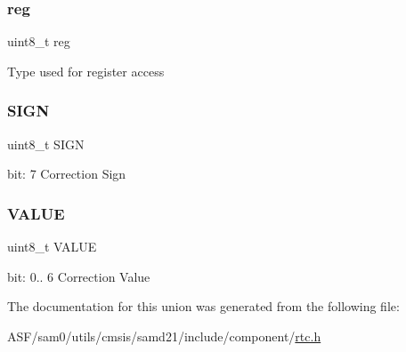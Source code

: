 \subsubsection{\texorpdfstring{reg}{reg}}
{\footnotesize\ttfamily uint8\+\_\+t reg}

Type used for register access \mbox{\label{union_r_t_c___f_r_e_q_c_o_r_r___type_a30425cd38d0d67a5052dc21383692fe4}} 
\subsubsection{\texorpdfstring{SIGN}{SIGN}}
{\footnotesize\ttfamily uint8\+\_\+t S\+I\+GN}

bit\+: 7 Correction Sign \mbox{\label{union_r_t_c___f_r_e_q_c_o_r_r___type_a9b29f156e0b21de552a157a1248ee48e}} 
\subsubsection{\texorpdfstring{VALUE}{VALUE}}
{\footnotesize\ttfamily uint8\+\_\+t V\+A\+L\+UE}

bit\+: 0.. 6 Correction Value 

The documentation for this union was generated from the following file\+:\begin{DoxyCompactItemize}
\item 
A\+S\+F/sam0/utils/cmsis/samd21/include/component/\mbox{\hyperlink{component_2rtc_8h}{rtc.\+h}}\end{DoxyCompactItemize}
